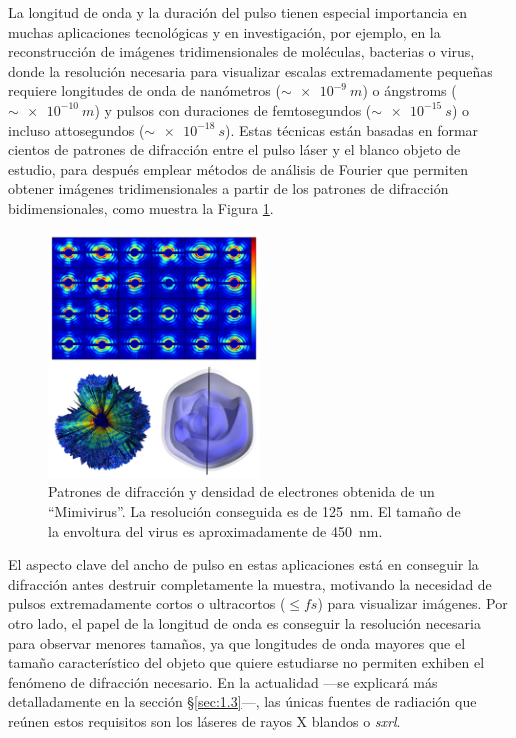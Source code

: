 La longitud de onda y la duración del pulso tienen especial importancia en muchas aplicaciones tecnológicas y en investigación, por ejemplo, en la reconstrucción de imágenes tridimensionales de moléculas\autocite{vonardenneStructureDeterminationSingle2018}, bacterias o virus\autocite{ekebergThreeDimensionalReconstructionGiant2015}, donde la resolución necesaria para visualizar escalas extremadamente pequeñas requiere longitudes de onda de nanómetros ($\sim\qty{e-9}{m}$) o ángstroms ($\sim\qty{e-10}{m}$) y pulsos con duraciones de femtosegundos ($\sim\qty{e-15}{s}$) o incluso attosegundos ($\sim\qty{e-18}{s}$). Estas técnicas están basadas en formar cientos de patrones de difracción entre el pulso láser y el blanco objeto de estudio, para después emplear métodos de análisis de Fourier que permiten obtener imágenes tridimensionales a partir de los patrones de difracción bidimensionales, como muestra la Figura \ref{fig:ch1_pulso}.

\begin{figure}[ht!]
  \centering
  \includegraphics[width=0.5\textwidth]{Figuras/ch1_pulso.png}
  \caption{Patrones de difracción y densidad de electrones obtenida de un \enquote{Mimivirus}\autocite{ekebergThreeDimensionalReconstructionGiant2015}. La resolución conseguida es de \qty{125}{nm}. El tamaño de la envoltura del virus es aproximadamente de \qty{450}{nm}.}
  \label{fig:ch1_pulso}
\end{figure}

El aspecto clave del ancho de pulso en estas aplicaciones está en conseguir la difracción antes destruir completamente la muestra\autocite{neutzePotentialBiomolecularImaging2000}, motivando la necesidad de pulsos extremadamente cortos o ultracortos ($\le\unit{fs}$) para visualizar imágenes. Por otro lado, el papel de la longitud de onda es conseguir la resolución necesaria para observar menores tamaños, ya que longitudes de onda mayores que el tamaño característico del objeto que quiere estudiarse no permiten exhiben el fenómeno de difracción necesario. En la actualidad ---se explicará más detalladamente en la sección \S\ref{sec:1.3}---, las únicas fuentes de radiación que reúnen estos requisitos son los láseres de rayos X blandos o \emph{\acrfull{sxrl}}.

